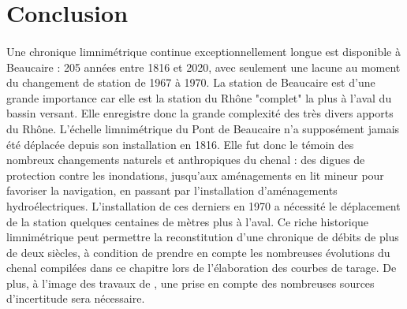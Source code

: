 \FloatBarrier
\section{Conclusion}

	\paragraph{} Une chronique limnimétrique continue exceptionnellement longue est disponible à Beaucaire : 205 années entre 1816 et 2020, avec seulement une lacune au moment du changement de station de 1967 à 1970. La station de Beaucaire est d'une grande importance car elle est la station du Rhône "complet" la plus à l'aval du bassin versant. Elle enregistre donc la grande complexité des très divers apports du Rhône. L'échelle limnimétrique du Pont de Beaucaire n'a supposément jamais été déplacée depuis son installation en 1816. Elle fut donc le témoin des nombreux changements naturels et anthropiques du chenal : des digues de protection contre les inondations, jusqu'aux aménagements en lit mineur pour favoriser la navigation, en passant par l'installation d'aménagements hydroélectriques. L'installation de ces derniers en 1970 a nécessité le déplacement de la station quelques centaines de mètres plus à l'aval. Ce riche historique limnimétrique peut permettre la reconstitution d'une chronique de débits de plus de deux siècles, à condition de prendre en compte les nombreuses évolutions du chenal compilées dans ce chapitre lors de l'élaboration des courbes de tarage. De plus, à l'image des travaux de \citet{bard_actualisation_2018}, une prise en compte des nombreuses sources d'incertitude sera nécessaire. 
	
